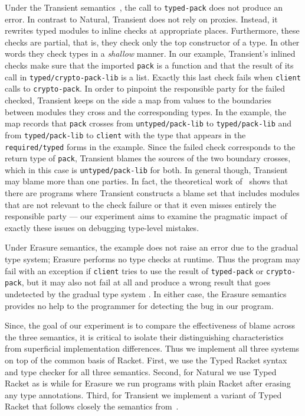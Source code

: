 Under the Transient semantics~\cite{vss-popl-2017}, the call to \texttt{typed-pack} does not
produce an error. In contrast to Natural, Transient does not rely on
proxies. Instead, it rewrites typed modules to inline checks at appropriate
places. Furthermore, these checks are
partial, that is, they check only the top constructor of a type. In other words
they check types in a  \emph{shallow} manner. In our
example, Transient's inlined checks make sure that the imported \texttt{pack} 
is a function and that the result of its call in \texttt{typed/crypto-pack-lib} is a list.   Exactly this
last check fails when \texttt{client} calls to \texttt{crypto-pack}. In
order to pinpoint the responsible party for the failed checked, Transient
keeps on the side a map from values to the boundaries between modules they
cross and the corresponding types. In the example, the map records that
\texttt{pack} crosses from \texttt{untyped/pack-lib} to
\texttt{typed/pack-lib} and from \texttt{typed/pack-lib} to
\texttt{client} with the type that appears in the \texttt{required/typed}
forms in the example. Since the failed check corresponds to the return
type of \texttt{pack}, Transient blames the sources of the two boundary
crosses, which in this case is \texttt{untyped/pack-lib} for both. In
general though, Transient may blame more than one parties. In fact, the
theoretical work of~\citet{gfd-oopsla-2019} shows that there are programs
where Transient constructs a blame set that includes modules that are not
relevant to the check failure or that it even misses entirely the responsible
party ---  our experiment aims to examine the pragmatic impact of exactly these
issues on debugging type-level mistakes.

Under Erasure semantics, the example does not raise an error due to the
gradual type system; Erasure performs no type checks at runtime. Thus the
program may fail with an exception if \texttt{client} tries to use the
result of \texttt{typed-pack} or \texttt{crypto-pack}, but it may also not
fail at all and produce a wrong result that goes undetected by the
gradual type system .  In either case, the Erasure semantics provides no
help to the programmer for detecting the bug in our program. 

Since, the goal of our experiment is to compare the effectiveness of blame
across the three semantics, it is critical to isolate their
distinguishing characteristics from superficial implementation
differences. Thus we implement all three systems on top of the common
basis of Racket. First, we use the Typed Racket syntax and type
checker for all three semantics. Second, for Natural we use Typed Racket as
is while for Erasure we run programs with plain Racket after erasing any
type annotations. Third, for Transient we implement a variant of Typed
Racket that follows closely the semantics from~\citet{vss-popl-2017}. 

